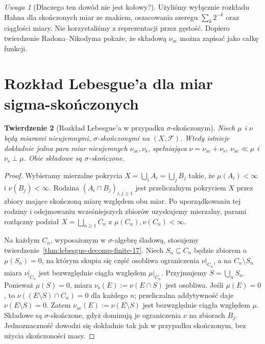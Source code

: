 \documentclass[11pt,a4paper,oneside]{book}
\numberwithin{equation}{chapter}
\theoremstyle{plain}
\newtheorem{twierdzenie}{Twierdzenie}[chapter]
\theoremstyle{definition}
\theoremstyle{remark}
\newtheorem{uwaga}[twierdzenie]{Uwaga}
\begin{document}
\begin{uwaga}[Dlaczego ten dowód nie jest kołowy?]
Użyliśmy wyłącznie rozkładu Hahna dla skończonych miar ze
znakiem, oszacowania szeregu $\sum_k2^{-k}$ oraz ciągłości
miary. Nie korzystaliśmy z reprezentacji przez gęstość.
Dopiero twierdzenie Radona--Nikodyma pokaże, że składową
$\nu_{\mathrm{ac}}$ można zapisać jako całkę funkcji.
\end{uwaga}

\section{Rozkład Lebesgue'a dla miar sigma-skończonych}
\begin{twierdzenie}[Rozkład Lebesgue'a w przypadku $\sigma$-skończonym]
\label{thm:lebesgue-decomp-sigfin-17}
Niech $\mu$ i $\nu$ będą miarami nieujemnymi,
$\sigma$-skończonymi na $(X,\mathcal F)$.
Wtedy istnieje dokładnie jedna para miar nieujemnych
$\nu_{\mathrm{ac}},\nu_{\mathrm{s}}$, spełniająca
$\nu=\nu_{\mathrm{ac}}+\nu_{\mathrm{s}}$,
$\nu_{\mathrm{ac}}\ll\mu$ i $\nu_{\mathrm{s}}\perp\mu$.
Obie składowe są $\sigma$-skończone.
\end{twierdzenie}
\begin{proof}
Wybieramy mierzalne pokrycia
$X=\bigcup_iA_i=\bigcup_jB_j$ takie, że
$\mu(A_i)<\infty$ i $\nu(B_j)<\infty$.
Rodzina $(A_i\cap B_j)_{i,j\ge1}$ jest przeliczalnym
pokryciem $X$ przez zbiory mające skończoną miarę
względem obu miar. Po uporządkowaniu tej rodziny
i odejmowaniu wcześniejszych zbiorów uzyskujemy
mierzalny, parami rozłączny podział $X=\bigsqcup_{n\ge1}C_n$
z $\mu(C_n),\nu(C_n)<\infty$.

Na każdym $C_n$, wyposażonym w $\sigma$-algebrę śladową,
stosujemy twierdzenie~\ref{thm:lebesgue-decomp-finite-17}.
Niech $S_n\subseteq C_n$ będzie zbiorem o
$\mu(S_n)=0$, na którym skupia się część osobliwa
ograniczenia $\nu|_{C_n}$, a na $C_n\setminus S_n$
miara $\nu|_{C_n}$ jest bezwzględnie ciągła względem
$\mu|_{C_n}$. Przyjmujemy $S=\bigcup_nS_n$.
Ponieważ $\mu(S)=0$, miara
$\nu_{\mathrm{s}}(E):=\nu(E\cap S)$ jest osobliwa.
Jeśli $\mu(E)=0$, to
$\nu((E\setminus S)\cap C_n)=0$ dla każdego $n$;
przeliczalna addytywność daje $\nu(E\setminus S)=0$.
Zatem $\nu_{\mathrm{ac}}(E):=\nu(E\setminus S)$
jest bezwzględnie ciągła względem $\mu$.
Składowe są $\sigma$-skończone, gdyż dominują je
ograniczenia $\nu$ na zbiorach $B_j$.
Jednoznaczność dowodzi się dokładnie tak jak
w przypadku skończonym, bez użycia skończoności masy.
\end{proof}
\end{document}

